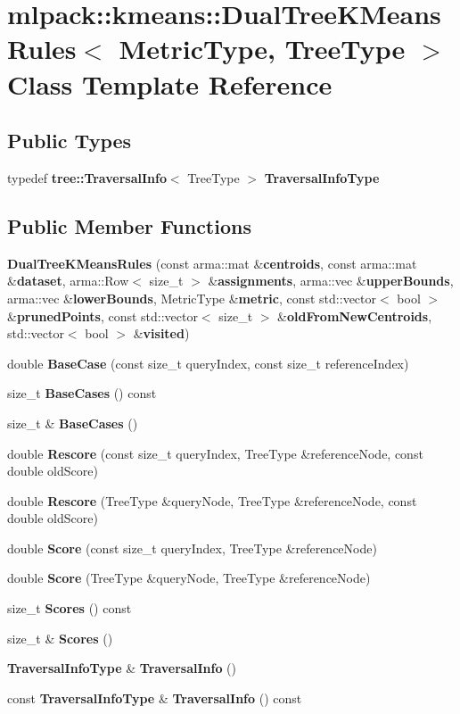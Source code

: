 \section{mlpack\+:\+:kmeans\+:\+:Dual\+Tree\+K\+Means\+Rules$<$ Metric\+Type, Tree\+Type $>$ Class Template Reference}
\label{classmlpack_1_1kmeans_1_1DualTreeKMeansRules}
\subsection*{Public Types}
\begin{DoxyCompactItemize}
\item 
typedef {\bf tree\+::\+Traversal\+Info}$<$ Tree\+Type $>$ {\bf Traversal\+Info\+Type}
\end{DoxyCompactItemize}
\subsection*{Public Member Functions}
\begin{DoxyCompactItemize}
\item 
{\bf Dual\+Tree\+K\+Means\+Rules} (const arma\+::mat \&{\bf centroids}, const arma\+::mat \&{\bf dataset}, arma\+::\+Row$<$ size\+\_\+t $>$ \&{\bf assignments}, arma\+::vec \&{\bf upper\+Bounds}, arma\+::vec \&{\bf lower\+Bounds}, Metric\+Type \&{\bf metric}, const std\+::vector$<$ bool $>$ \&{\bf pruned\+Points}, const std\+::vector$<$ size\+\_\+t $>$ \&{\bf old\+From\+New\+Centroids}, std\+::vector$<$ bool $>$ \&{\bf visited})
\item 
double {\bf Base\+Case} (const size\+\_\+t query\+Index, const size\+\_\+t reference\+Index)
\item 
size\+\_\+t {\bf Base\+Cases} () const 
\item 
size\+\_\+t \& {\bf Base\+Cases} ()
\item 
double {\bf Rescore} (const size\+\_\+t query\+Index, Tree\+Type \&reference\+Node, const double old\+Score)
\item 
double {\bf Rescore} (Tree\+Type \&query\+Node, Tree\+Type \&reference\+Node, const double old\+Score)
\item 
double {\bf Score} (const size\+\_\+t query\+Index, Tree\+Type \&reference\+Node)
\item 
double {\bf Score} (Tree\+Type \&query\+Node, Tree\+Type \&reference\+Node)
\item 
size\+\_\+t {\bf Scores} () const 
\item 
size\+\_\+t \& {\bf Scores} ()
\item 
{\bf Traversal\+Info\+Type} \& {\bf Traversal\+Info} ()
\item 
const {\bf Traversal\+Info\+Type} \& {\bf Traversal\+Info} () const 
\end{DoxyCompactItemize}
